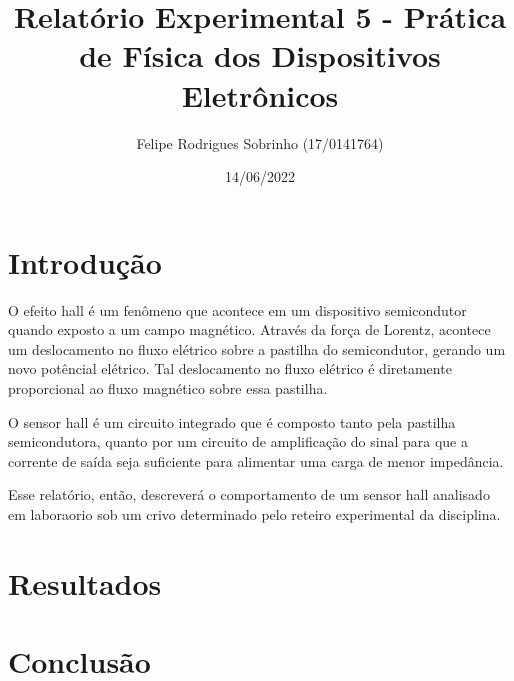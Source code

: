 \documentclass[12pt, onecolumn]{IEEEtran}
\title{Relatório Experimental 5 - Prática de Física dos Dispositivos Eletrônicos}
\author{Felipe Rodrigues Sobrinho (17/0141764)}
\date{14/06/2022}
\begin{document}
\maketitle

\section{Introdução}

O efeito hall é um fenômeno que acontece em um dispositivo semicondutor quando exposto a um campo magnético. Através da força de Lorentz, acontece um deslocamento no fluxo elétrico sobre a pastilha do semicondutor, gerando um novo potêncial elétrico. Tal deslocamento no fluxo elétrico é diretamente proporcional ao fluxo magnético sobre essa pastilha.

O sensor hall é um circuito integrado que é composto tanto pela pastilha semicondutora, quanto por um circuito de amplificação do sinal para que a corrente de saída seja suficiente para alimentar uma carga de menor impedância.

Esse relatório, então, descreverá o comportamento de um sensor hall analisado em laboraorio sob um crivo determinado pelo reteiro experimental da disciplina.

\section{Resultados}

\section{Conclusão}
\end{document}
